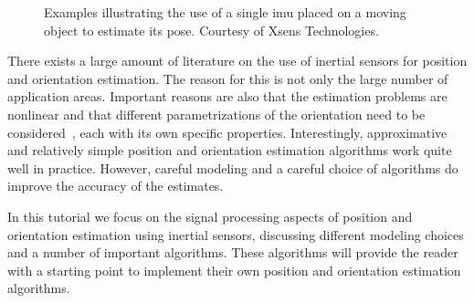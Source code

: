 \begin{figure}
  \centering
   \hspace{2mm}
  \caption{Examples illustrating the use of a single \gls{imu} placed on a moving 
object to estimate its pose. Courtesy of Xsens Technologies.}
  \label{fig:intro-singleSensorApplications}
\end{figure}

There exists a large amount of literature on the use of inertial sensors for position and orientation estimation. The reason for this is not only the large number of application areas. Important reasons are also that the estimation problems are nonlinear and that different parametrizations of the orientation need to be considered~\citep{grisettiKSB:2010,kurzGJH:2013}, each with its own specific properties. Interestingly, approximative and relatively simple position and orientation estimation algorithms work quite well in practice. However, careful modeling and a careful choice of algorithms do improve the accuracy of the estimates. 

In this tutorial we focus on the signal processing aspects of position and orientation estimation using inertial sensors, discussing different modeling choices and a number of important algorithms. These algorithms will provide the reader with a starting point to implement their own position and orientation estimation algorithms. 

